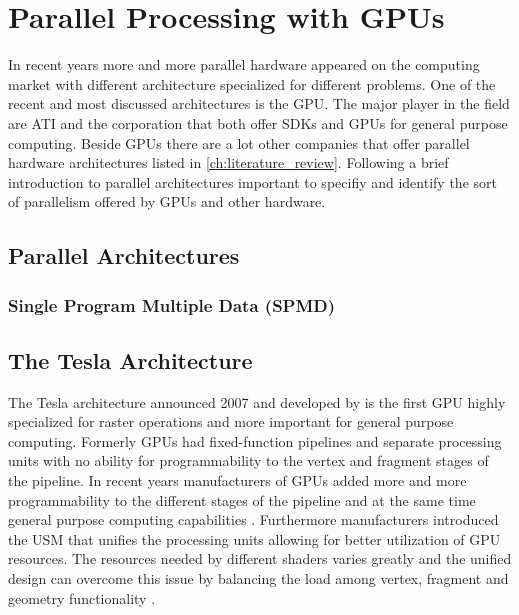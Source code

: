 

\chapter{Parallel Processing with GPUs}%
\label{cha:parallel_processing_with_gpu} 

In recent years more and more parallel hardware appeared on the computing market
with different architecture specialized for different problems. One of the recent
and most discussed architectures is the \gls{GPU}. The major player in the field
are  \gls{ATI} and the  corporation that both offer 
\glspl{SDK} and \glspl{GPU} for general purpose computing. Beside \glspl{GPU} there
are a lot other companies that offer parallel hardware architectures listed in 
\autoref{ch:literature_review}. Following a brief introduction to parallel
 architectures important to specifiy and identify the sort of parallelism offered
by \glspl{GPU} and other hardware.

\section{Parallel Architectures}
\label{sec:parallel_architectures} 



\subsection{Single Program Multiple Data (SPMD)}
\label{ssub:single_program_multiple_data_spmd} 



\section{The Tesla Architecture}%
\label{sub:the_tesla_architecture} 
The Tesla architecture announced 2007 and developed by {} is the first
\gls{GPU} highly specialized for raster operations and more important
for general purpose computing. Formerly \glspl{GPU} had fixed-function
pipelines and separate processing units with no ability for programmability to
the vertex and fragment stages of the pipeline. In recent years manufacturers of
\glspl{GPU} added more and more programmability to the different stages
of the pipeline and at the same time general purpose computing capabilities
\citep{citeulike:3844545}. Furthermore manufacturers introduced the  \gls{USM} 
that unifies the processing units allowing for better
utilization of  \gls{GPU} resources. The resources needed by different
shaders varies greatly and the unified design can overcome this issue by
balancing the load among vertex, fragment and geometry functionality
\citep{citeulike:3145468}.

